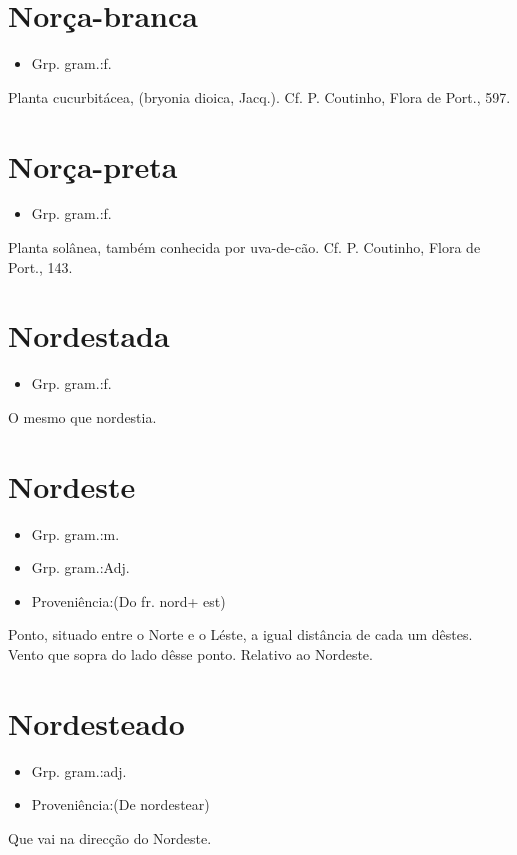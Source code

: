\section{Norça-branca}
\begin{itemize}
\item {Grp. gram.:f.}
\end{itemize}
Planta cucurbitácea, (\textunderscore bryonia dioica\textunderscore , Jacq.). Cf. P. Coutinho, \textunderscore Flora de Port.\textunderscore , 597.
\section{Norça-preta}
\begin{itemize}
\item {Grp. gram.:f.}
\end{itemize}
Planta solânea, também conhecida por \textunderscore uva-de-cão\textunderscore . Cf. P. Coutinho, \textunderscore Flora de Port.\textunderscore , 143.
\section{Nordestada}
\begin{itemize}
\item {Grp. gram.:f.}
\end{itemize}
O mesmo que \textunderscore nordestia\textunderscore .
\section{Nordeste}
\begin{itemize}
\item {Grp. gram.:m.}
\end{itemize}
\begin{itemize}
\item {Grp. gram.:Adj.}
\end{itemize}
\begin{itemize}
\item {Proveniência:(Do fr. \textunderscore nord\textunderscore  + \textunderscore est\textunderscore )}
\end{itemize}
Ponto, situado entre o Norte e o Léste, a igual distância de cada um dêstes.
Vento que sopra do lado dêsse ponto.
Relativo ao Nordeste.
\section{Nordesteado}
\begin{itemize}
\item {Grp. gram.:adj.}
\end{itemize}
\begin{itemize}
\item {Proveniência:(De \textunderscore nordestear\textunderscore )}
\end{itemize}
Que vai na direcção do Nordeste.
